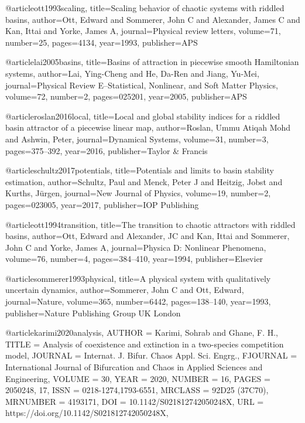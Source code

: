 @article{ott1993scaling,
  title={Scaling behavior of chaotic systems with riddled basins},
  author={Ott, Edward and Sommerer, John C and Alexander, James C and Kan, Ittai and Yorke, James A},
  journal={Physical review letters},
  volume={71},
  number={25},
  pages={4134},
  year={1993},
  publisher={APS}
}

@article{lai2005basins,
  title={Basins of attraction in piecewise smooth Hamiltonian systems},
  author={Lai, Ying-Cheng and He, Da-Ren and Jiang, Yu-Mei},
  journal={Physical Review E--Statistical, Nonlinear, and Soft Matter Physics},
  volume={72},
  number={2},
  pages={025201},
  year={2005},
  publisher={APS}
}

@article{roslan2016local,
  title={Local and global stability indices for a riddled basin attractor of a piecewise linear map},
  author={Roslan, Ummu Atiqah Mohd and Ashwin, Peter},
  journal={Dynamical Systems},
  volume={31},
  number={3},
  pages={375--392},
  year={2016},
  publisher={Taylor \& Francis}
}

@article{schultz2017potentials,
  title={Potentials and limits to basin stability estimation},
  author={Schultz, Paul and Menck, Peter J and Heitzig, Jobst and Kurths, J{\"u}rgen},
  journal={New Journal of Physics},
  volume={19},
  number={2},
  pages={023005},
  year={2017},
  publisher={IOP Publishing}
}


@article{ott1994transition,
  title={The transition to chaotic attractors with riddled basins},
  author={Ott, Edward and Alexander, JC and Kan, Ittai and Sommerer, John C and Yorke, James A},
  journal={Physica D: Nonlinear Phenomena},
  volume={76},
  number={4},
  pages={384--410},
  year={1994},
  publisher={Elsevier}
}


@article{sommerer1993physical,
  title={A physical system with qualitatively uncertain dynamics},
  author={Sommerer, John C and Ott, Edward},
  journal={Nature},
  volume={365},
  number={6442},
  pages={138--140},
  year={1993},
  publisher={Nature Publishing Group UK London}
}

@article{karimi2020analysis,
    AUTHOR = {Karimi, Sohrab and Ghane, F. H.},
     TITLE = {Analysis of coexistence and extinction in a two-species
              competition model},
   JOURNAL = {Internat. J. Bifur. Chaos Appl. Sci. Engrg.},
  FJOURNAL = {International Journal of Bifurcation and Chaos in Applied
              Sciences and Engineering},
    VOLUME = {30},
      YEAR = {2020},
    NUMBER = {16},
     PAGES = {2050248, 17},
      ISSN = {0218-1274,1793-6551},
   MRCLASS = {92D25 (37C70)},
  MRNUMBER = {4193171},
       DOI = {10.1142/S021812742050248X},
       URL = {https://doi.org/10.1142/S021812742050248X},
}

